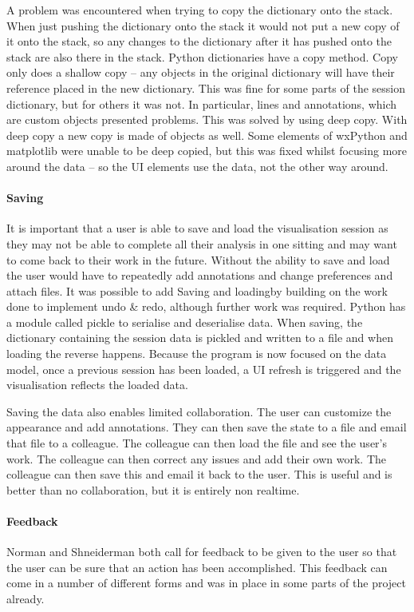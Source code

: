 A problem was encountered when trying to copy the dictionary onto the stack.  When just pushing the dictionary onto the stack it would not put a new copy of it onto the stack, so any changes to the dictionary after it has pushed onto the stack are also there in the stack.  Python dictionaries have a copy method.  Copy only does a shallow copy -- any objects in the original dictionary will have their reference placed in the new dictionary.  This was fine for some parts of the session dictionary, but for others it was not. In particular, lines and annotations, which are custom objects presented problems.  This was solved by using deep copy.  With deep copy a new copy is made of objects as well.  Some elements of wxPython and matplotlib were unable to be deep copied, but this was fixed whilst focusing more around the data -- so the \ac{UI} elements use the data, not the other way around.

\paragraph{Saving}

It is important that a user is able to save and load the visualisation session as they may not be able to complete all their analysis in one sitting and may want to come back to their work in the future.  Without the ability to save and load the user would have to repeatedly add annotations and change preferences and attach files.  It was possible to add Saving and loadingby building on the work done to implement undo \& redo, although further work was required. Python has a module called pickle to serialise and deserialise data.  When saving, the dictionary containing the session data is pickled and written to a file and when loading the reverse happens.  Because the program is now focused on the data model, once a previous session has been loaded, a \ac{UI} refresh is triggered and the visualisation reflects the loaded data.

Saving the data also enables limited collaboration.  The user can customize the appearance and add annotations.  They can then save the state to a file and email that file to a colleague.  The colleague can then load the file and see the user's work.  The colleague can then correct any issues and add their own work.  The colleague can then save this and email it back to the user.  This is useful and is better than no collaboration, but it is entirely non realtime.

\paragraph{Feedback}
Norman and Shneiderman both call for feedback to be given to the user so that the user can be sure that an action has been accomplished.  This feedback can come in a number of different forms and was in place in some parts of the project already.

